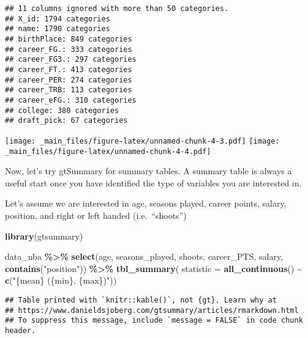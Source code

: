 \documentclass[
]{book}
\newenvironment{Shaded}{\begin{snugshade}}{\end{snugshade}}
\newcommand{\AttributeTok}[1]{\textcolor[rgb]{0.13,0.29,0.53}{#1}}
\newcommand{\FunctionTok}[1]{\textcolor[rgb]{0.13,0.29,0.53}{\textbf{#1}}}
\newcommand{\NormalTok}[1]{#1}
\newcommand{\SpecialCharTok}[1]{\textcolor[rgb]{0.81,0.36,0.00}{\textbf{#1}}}
\newcommand{\StringTok}[1]{\textcolor[rgb]{0.31,0.60,0.02}{#1}}
\begin{document}
\begin{verbatim}
## 11 columns ignored with more than 50 categories.
## X_id: 1794 categories
## name: 1790 categories
## birthPlace: 849 categories
## career_FG.: 333 categories
## career_FG3.: 297 categories
## career_FT.: 413 categories
## career_PER: 274 categories
## career_TRB: 113 categories
## career_eFG.: 310 categories
## college: 380 categories
## draft_pick: 67 categories
\end{verbatim}

\texttt{[image: \_main\_files/figure-latex/unnamed-chunk-4-3.pdf]} \texttt{[image: \_main\_files/figure-latex/unnamed-chunk-4-4.pdf]}

Now, let's try gtSummary for summary tables. A summary table is always a useful start once you have identified the type of variables you are interested in.

Let's assume we are interested in age, seasons played, career points, salary,
position, and right or left handed (i.e.~``shoots'')

\begin{Shaded}
\begin{Highlighting}[]
\FunctionTok{library}\NormalTok{(gtsummary)}

\NormalTok{data\_nba }\SpecialCharTok{\%\textgreater{}\%} 
  \FunctionTok{select}\NormalTok{(age, seasons\_played, shoots, career\_PTS, salary, }\FunctionTok{contains}\NormalTok{(}\StringTok{"position"}\NormalTok{)) }\SpecialCharTok{\%\textgreater{}\%}
         \FunctionTok{tbl\_summary}\NormalTok{(}
           \AttributeTok{statistic =} \FunctionTok{all\_continuous}\NormalTok{() }\SpecialCharTok{\textasciitilde{}} \FunctionTok{c}\NormalTok{(}\StringTok{"\{mean\} (\{min\}, \{max\})"}\NormalTok{)) }
\end{Highlighting}
\end{Shaded}

\begin{verbatim}
## Table printed with `knitr::kable()`, not {gt}. Learn why at
## https://www.danieldsjoberg.com/gtsummary/articles/rmarkdown.html
## To suppress this message, include `message = FALSE` in code chunk header.
\end{verbatim}
\end{document}
